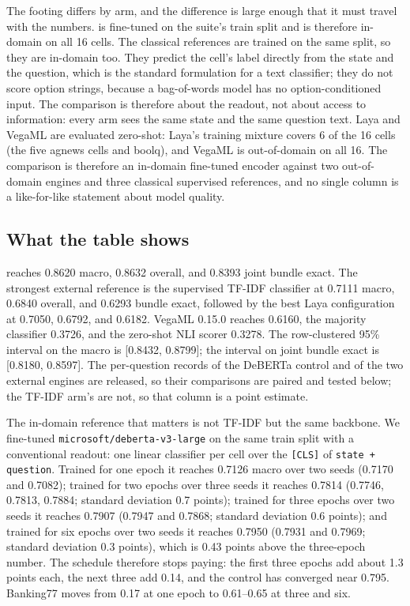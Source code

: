 The footing differs by arm, and the difference is large enough that it must travel with the
numbers. \vsix{} is fine-tuned on the suite's train split and is therefore in-domain on all 16
cells. The classical references are trained on the same split, so they are in-domain too. They predict
the cell's label directly from the state and the question, which is the standard formulation for a
text classifier; they do not score option strings, because a bag-of-words model has no
option-conditioned input. The comparison is therefore about the readout, not about access to
information: every arm sees the same state and the same question text.
Laya and VegaML are evaluated zero-shot: Laya's training mixture covers 6 of the 16 cells (the
five agnews cells and boolq), and VegaML is out-of-domain on all 16. The comparison is therefore
an in-domain fine-tuned encoder against two out-of-domain engines and three classical supervised
references, and no single column is a like-for-like statement about model quality.

\subsection{What the table shows}
\vsix{} reaches 0.8620 macro, 0.8632 overall, and 0.8393 joint bundle exact. The strongest
external reference is the supervised TF-IDF classifier at 0.7111 macro, 0.6840 overall, and
0.6293 bundle exact, followed by the best Laya configuration at 0.7050, 0.6792, and 0.6182.
VegaML 0.15.0 reaches 0.6160, the majority classifier 0.3726, and the zero-shot NLI scorer 0.3278.
The row-clustered 95\% interval on the \vsix{} macro is [0.8432, 0.8799]; the interval on joint
bundle exact is [0.8180, 0.8597]. The per-question records of the DeBERTa control and of the two
external engines are released, so their comparisons are paired and tested below; the TF-IDF arm's
are not, so that column is a point estimate.

The in-domain reference that matters is not TF-IDF but the same backbone. We fine-tuned
\texttt{microsoft/deberta-v3-large} on the same train split with a conventional readout: one linear
classifier per cell over the \texttt{[CLS]} of \texttt{state + question}. Trained for one epoch it reaches 0.7126 macro over two seeds (0.7170 and 0.7082); trained for two
epochs over three seeds it reaches 0.7814 (0.7746, 0.7813, 0.7884; standard deviation 0.7 points);
trained for three epochs over two seeds it reaches 0.7907 (0.7947 and 0.7868; standard deviation 0.6
points); and trained for six epochs over two seeds it reaches 0.7950 (0.7931 and 0.7969; standard
deviation 0.3 points), which is 0.43 points above the three-epoch number. The schedule therefore
stops paying: the first three epochs add about 1.3 points each, the next three add 0.14, and the
control has converged near 0.795. Banking77 moves from 0.17 at one epoch to 0.61--0.65 at three and
six.

